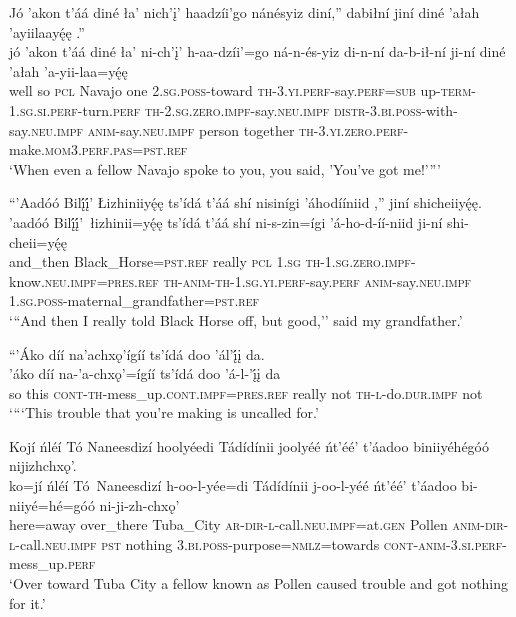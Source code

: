 \ea\label{ex:text2-22-5}
Jó ’akon t’áá diné ła’ nich’į’ haadzíi’go nánésyiz diní,'' dabiłní jiní diné ’ałah ’ayiilaayę́ę .''\\
\gll jó	’akon	t’áá	diné	ła’	ni-ch’į’	h-aa-dzíi’=go	ná-n-és-yiz	di-n-ní	da-b-ił-ní	ji-ní	diné	’ałah	’a-yii-laa=yę́ę\\
     well	so	\textsc{pcl}	Navajo	one	2.\textsc{sg}.\textsc{poss}-toward	\textsc{th}-3.\textsc{yi}.\textsc{perf}-say.\textsc{perf}=\textsc{sub}	up-\textsc{term}-1.\textsc{sg}.\textsc{si}.\textsc{perf}-turn.\textsc{perf}	\textsc{th}-2.\textsc{sg}.\textsc{zero}.\textsc{impf}-say.\textsc{neu}.\textsc{impf}	\textsc{distr}-3.\textsc{bi}.\textsc{poss}-with-say.\textsc{neu}.\textsc{impf}	\textsc{anim}-say.\textsc{neu}.\textsc{impf}	person	together	\textsc{th}-3.\textsc{yi}.\textsc{zero}.\textsc{perf}-make.\textsc{mom}3.\textsc{perf}.\textsc{pas}=\textsc{pst}.\textsc{ref}\\
\glt `When even a fellow Navajo spoke to you, you said, 'You've got me!'{''}'
\z

\ea\label{ex:text2-23}
``’Aadóó Bilį́į́’ Łizhiniiyę́ę ts’ídá t’áá shí nisinígi ’áhodííniid ,'' jiní shicheiiyę́ę.\\
\gll ’aadóó	Bilį́į́’~{łizhinii=yę́ę}	ts’ídá	t’áá	shí	ni-s-zin=ígi	’á-ho-d-íí-niid	ji-ní	shi-cheii=yę́ę\\
     and\_then	Black\_Horse=\textsc{pst}.\textsc{ref}	really	\textsc{pcl}	1.\textsc{sg}	\textsc{th}-1.\textsc{sg}.\textsc{zero}.\textsc{impf}-know.\textsc{neu}.\textsc{impf}=\textsc{pres}.\textsc{ref}	\textsc{th}-\textsc{anim}-\textsc{th}-1.\textsc{sg}.\textsc{yi}.\textsc{perf}-say.\textsc{perf}	\textsc{anim}-say.\textsc{neu}.\textsc{impf}	1.\textsc{sg}.\textsc{poss}-maternal\_grandfather=\textsc{pst}.\textsc{ref}\\
\glt `{``}And then I really told Black Horse off, but good,'' said my grandfather.'
\z

\ea\label{ex:text2-24-1}
``’Áko díí na’achxǫ’ígíí ts’ídá doo ’ál’į́į da.\\
\gll ’áko	díí	na-’a-chxǫ’=ígíí	ts’ídá	doo	’á-l-’į́į	da\\
     so	this	\textsc{cont}-\textsc{th}-mess\_up.\textsc{cont}.\textsc{impf}=\textsc{pres}.\textsc{ref}	really	not	\textsc{th}-\textsc{l}-do.\textsc{dur}.\textsc{impf}	not\\
\glt `{``}`This trouble that you're making is uncalled for.'
\z

\ea\label{ex:text2-24-2}
Kojí ńléí Tó Naneesdizí hoolyéedi Tádídínii joolyéé ńt’éé’ t’áadoo biniiyéhégóó nijizhchxǫ’.\\
\gll ko=jí	ńléí	Tó~{Naneesdizí}	h-oo-l-yée=di	Tádídínii	j-oo-l-yéé	ńt’éé’	t’áadoo	bi-niiyé=hé=góó	ni-ji-zh-chxǫ’\\
     here=away	over\_there	Tuba\_City	\textsc{ar}-\textsc{dir}-\textsc{l}-call.\textsc{neu}.\textsc{impf}=at.\textsc{gen}	Pollen	\textsc{anim}-\textsc{dir}-\textsc{l}-call.\textsc{neu}.\textsc{impf}	\textsc{pst}	nothing	3.\textsc{bi}.\textsc{poss}-purpose=\textsc{nmlz}=towards	\textsc{cont}-\textsc{anim}-3.\textsc{si}.\textsc{perf}-mess\_up.\textsc{perf}\\
\glt `Over toward Tuba City a fellow known as Pollen caused trouble and got nothing for it.'
\z


